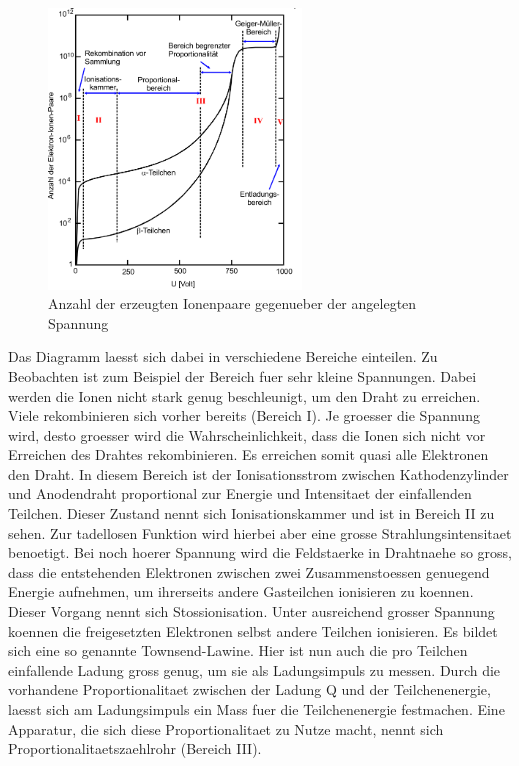 \documentclass[titlepage=firstcover, captions=tableheading]{scrartcl}
\begin{document}
 \begin{figure}[H]
    \centering
    \includegraphics[width=0.6\textwidth]{"Spannung_Geiger.png"}
    \caption{Anzahl der erzeugten Ionenpaare gegenueber der angelegten Spannung}
    \label{Fig:Spannung}
\end{figure}
Das Diagramm laesst sich dabei in verschiedene Bereiche einteilen. Zu Beobachten ist zum Beispiel der Bereich fuer sehr kleine Spannungen. Dabei werden die Ionen nicht stark genug beschleunigt, um den Draht zu erreichen. Viele rekombinieren sich vorher bereits (Bereich I). Je groesser die Spannung wird, desto groesser wird die Wahrscheinlichkeit, dass die Ionen sich nicht vor Erreichen des Drahtes rekombinieren. Es erreichen somit quasi alle Elektronen den Draht. In diesem Bereich ist der Ionisationsstrom zwischen Kathodenzylinder und Anodendraht proportional zur Energie und Intensitaet der einfallenden Teilchen. Dieser Zustand nennt sich Ionisationskammer und ist in Bereich II zu sehen. Zur tadellosen Funktion wird hierbei aber eine grosse Strahlungsintensitaet benoetigt. Bei noch hoerer Spannung wird die Feldstaerke in Drahtnaehe so gross, dass die entstehenden Elektronen zwischen zwei Zusammenstoessen genuegend Energie aufnehmen, um ihrerseits andere Gasteilchen ionisieren zu koennen. Dieser Vorgang nennt sich Stossionisation. Unter ausreichend grosser Spannung koennen die freigesetzten Elektronen selbst andere Teilchen ionisieren. Es bildet sich eine so genannte Townsend-Lawine. Hier ist nun auch die pro Teilchen einfallende Ladung gross genug, um sie als Ladungsimpuls zu messen. Durch die vorhandene Proportionalitaet zwischen der Ladung Q und der Teilchenenergie, laesst sich am Ladungsimpuls ein Mass fuer die Teilchenenergie festmachen. Eine Apparatur, die sich diese Proportionalitaet zu Nutze macht, nennt sich Proportionalitaetszaehlrohr (Bereich III).
\end{document}
